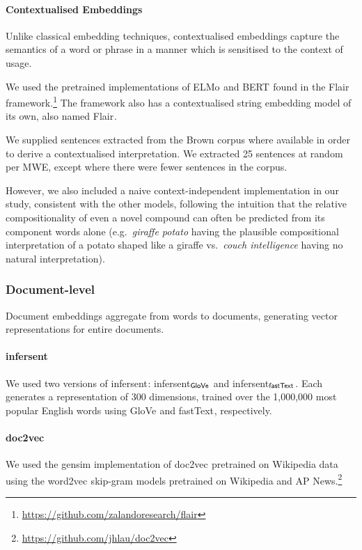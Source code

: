 \documentclass[11pt,a4paper]{article}
\newcommand{\embmethod}[2][]{\textsf{#2}$_{\text{#1}}$\xspace}
\newcommand{\wordtovec}{\embmethod{word2vec}}
\newcommand{\infersent}[1][]{\embmethod[#1]{infersent}}
\newcommand{\doctovec}{\embmethod{doc2vec}}
\newcommand{\elmo}{\embmethod{ELMo}}
\newcommand{\fasttext}{\embmethod{fastText}}
\newcommand{\glove}{\embmethod{GloVe}}
\newcommand{\bert}{\embmethod{BERT}}
\newcommand{\flair}{\embmethod{Flair}}
\begin{document}
\paragraph{Contextualised Embeddings}
Unlike classical embedding techniques, contextualised embeddings capture the semantics of a word or phrase in a manner which is sensitised to the context of usage.

We used the pretrained implementations of \elmo \cite{Peters2018} and \bert \cite{Devlin2018} found in the \flair framework.\footnote{\url{https://github.com/zalandoresearch/flair}} The framework also has a contextualised string embedding model of its own, also named \flair \cite{Akbik2018}.

We supplied sentences extracted from the Brown corpus where available in order to derive a contextualised interpretation. We extracted 25 sentences at random per MWE, except where there were fewer sentences in the corpus.

However, we also included a naive context-independent implementation in our study, consistent with the other models, following the intuition that the relative compositionality of even a novel compound can often be predicted from its component words alone (e.g.\ \textit{giraffe potato} having the plausible compositional interpretation of a potato shaped like a giraffe vs.\ \textit{couch intelligence} having no natural interpretation).

\subsubsection{Document-level}
Document embeddings aggregate from words to documents, generating vector representations for entire documents.

\paragraph{\infersent}
We used two versions of \infersent \cite{Conneau2017b}: \infersent[\glove] and \infersent[\fasttext]. Each generates a representation of 300 dimensions, trained over the 1,000,000 most popular English words using \glove \cite{Jeffrey2014} and \fasttext, respectively.

\paragraph{\doctovec}
We used the gensim implementation of \doctovec \cite{Le+:2014,Lau:Baldwin:2016b} pretrained on Wikipedia data using the \wordtovec skip-gram models pretrained on Wikipedia and AP News.\footnote{\url{https://github.com/jhlau/doc2vec}}
\end{document}
